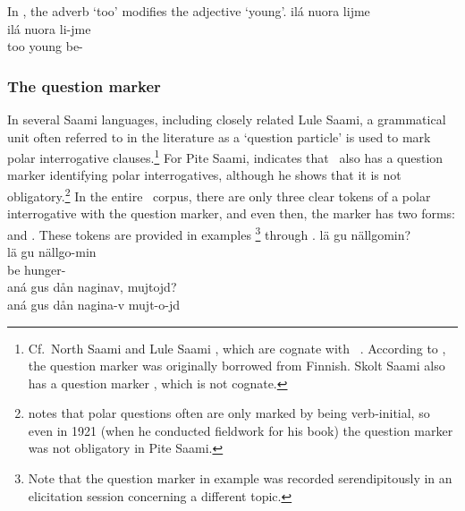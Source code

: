 In , the adverb  ‘too’ modifies the adjective  ‘young’. 
\ea\label{ADVsEx2}%
\glll	ilá nuora lijme\\
	ilá nuora li-jme\\
	too young\BS{} be-\\\nopagebreak
{}	
\z


\subsubsection{The question marker \TILDE{}}\label{QpartWordform}
In several Saami languages, including closely related Lule Saami, a grammatical unit often referred to in the literature as a ‘question particle’ is used to mark polar interrogative clauses.\footnote{Cf.~North Saami  \citep[cf.][90]{Svonni2009} and Lule Saami  \citep[cf.][94-94]{Spiik1989}, which are cognate with \PS\ \TILDE{}. According to \citet[245]{Sammallahti1998}, the question marker was originally borrowed from Finnish. Skolt Saami also has a question marker  \citep[cf.][319-320]{Feist2010}, which is not cognate.} 
For Pite Saami, \citet[20-21]{Lagercrantz1926} %
indicates that \PS\ also has a question marker  identifying polar interrogatives, although he shows that it is not obligatory.\footnote{\citet[21]{Lagercrantz1926} notes that polar questions often are only marked by being verb-initial, so even in 1921 (when he conducted fieldwork for his book) the question marker was not obligatory in Pite Saami.} 
In the entire \PSDP\ corpus, there are only three clear tokens of a polar interrogative with the question marker, and even then, the marker has two forms:  and . These tokens are provided in examples \footnote{Note that the question marker in example  was recorded serendipitously in an elicitation session concerning a different topic.} 
through . 
\ea\label{Qpart1}
\glll	lä gu nällgomin?\\
	lä gu nällgo-min\\
	be\BS{}  hunger-\\\nopagebreak
{}  %
\z
\ea\label{Qpart2}
\glll	aná gus dån naginav, mujtojd?\\
	aná gus dån nagina-v mujt-o-jd\\

